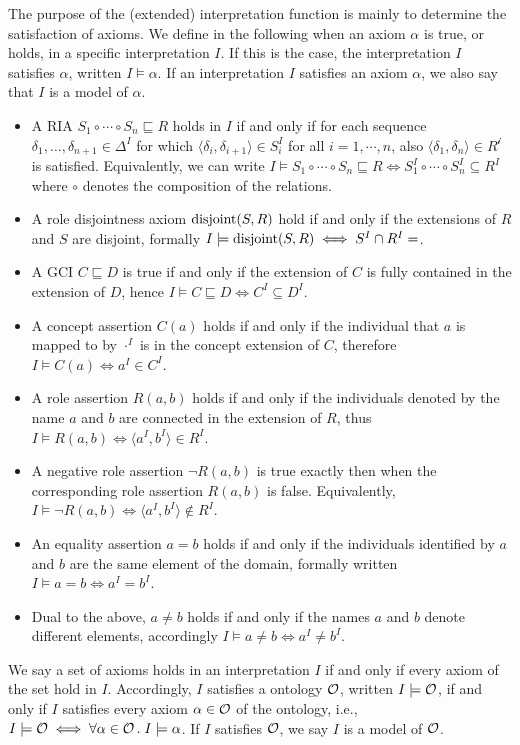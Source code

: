 The purpose of the (extended) interpretation function is mainly to determine the satisfaction of axioms. We define in the following when an axiom $\alpha$ is true, or holds, in a specific interpretation $I$. If this is the case, the interpretation $I$ satisfies $\alpha$, written $I \models \alpha$. If an interpretation $I$ satisfies an axiom $\alpha$, we also say that $I$ is a model of $\alpha$.
\begin{itemize}
  \item A RIA $S_1 \circ \cdots \circ S_n \sqsubseteq R$ holds in $I$ if and only if for each sequence $\delta_1, \dots, \delta_{n + 1} \in \Delta^I$ for which $\langle \delta_i , \delta_{i + 1} \rangle \in S_i^I$ for all $i = 1, \cdots, n$, also $\langle \delta_1 , \delta_n \rangle \in R^\mathcal{i}$ is satisfied. Equivalently, we can write $I \models S_1 \circ \cdots \circ S_n \sqsubseteq R \iff S_1^I \circ \cdots \circ S_n^I \subseteq R^I$ where $\circ$ denotes the composition of the relations.
  \item A role disjointness axiom $\operatorname{disjoint}(S, R)$ hold if and only if the extensions of $R$ and $S$ are disjoint, formally $I \models \disjoint(S, R) \iff S^I \cap R^I = \empty$.
  \item A GCI $C \sqsubseteq D$ is true if and only if the extension of $C$ is fully contained in the extension of $D$, hence $I \models C \sqsubseteq D \iff C^I \subseteq D^I$.
  \item A concept assertion $C(a)$ holds if and only if the individual that $a$ is mapped to by $\cdot^I$ is in the concept extension of $C$, therefore $I \models C (a) \iff a^I \in C^I$.
  \item A role assertion $R(a, b)$ holds if and only if the individuals denoted by the name $a$ and $b$ are connected in the extension of $R$, thus $I \models R(a, b) \iff \langle a^I, b^I \rangle \in R^I$.
  \item A negative role assertion $\lnot R(a, b)$ is true exactly then when the corresponding role assertion $R(a, b)$ is false. Equivalently, $I \models \lnot R(a, b) \iff \langle a^I, b^I \rangle \not\in R^I$.
  \item An equality assertion $a = b$ holds if and only if the individuals identified by $a$ and $b$ are the same element of the domain, formally written $I \models a = b \iff a^I = b^I$.
  \item Dual to the above, $a \not = b$ holds if and only if the names $a$ and $b$ denote different elements, accordingly $I \models a \not= b \iff a^I \not= b^I$.
\end{itemize}
We say a set of axioms holds in an interpretation $I$ if and only if every axiom of the set hold in $I$. Accordingly, $I$ satisfies a ontology $\mathcal{O}$, written $I \models \mathcal{O}$, if and only if $I$ satisfies every axiom $\alpha \in \mathcal{O}$ of the ontology, i.e., $I \models \mathcal{O} \iff \forall \alpha \in \mathcal{O} \, . \; I \models \alpha$. If $I$ satisfies $\mathcal{O}$, we say $I$ is a model of $\mathcal{O}$.

